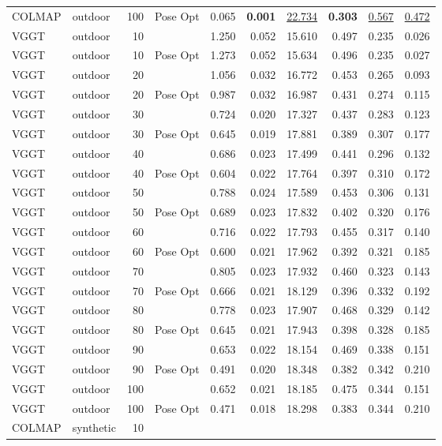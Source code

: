 \begin{table}[H]
\begin{tabular}{llrlrrrrrr}
COLMAP & outdoor & 100 & Pose Opt & 0.065 & \textbf{0.001} & \underline{22.734} & \textbf{0.303} & \underline{0.567} & \underline{0.472} \\
VGGT & outdoor & 10 &  & 1.250 & 0.052 & 15.610 & 0.497 & 0.235 & 0.026 \\
VGGT & outdoor & 10 & Pose Opt & 1.273 & 0.052 & 15.634 & 0.496 & 0.235 & 0.027 \\
VGGT & outdoor & 20 &  & 1.056 & 0.032 & 16.772 & 0.453 & 0.265 & 0.093 \\
VGGT & outdoor & 20 & Pose Opt & 0.987 & 0.032 & 16.987 & 0.431 & 0.274 & 0.115 \\
VGGT & outdoor & 30 &  & 0.724 & 0.020 & 17.327 & 0.437 & 0.283 & 0.123 \\
VGGT & outdoor & 30 & Pose Opt & 0.645 & 0.019 & 17.881 & 0.389 & 0.307 & 0.177 \\
VGGT & outdoor & 40 &  & 0.686 & 0.023 & 17.499 & 0.441 & 0.296 & 0.132 \\
VGGT & outdoor & 40 & Pose Opt & 0.604 & 0.022 & 17.764 & 0.397 & 0.310 & 0.172 \\
VGGT & outdoor & 50 &  & 0.788 & 0.024 & 17.589 & 0.453 & 0.306 & 0.131 \\
VGGT & outdoor & 50 & Pose Opt & 0.689 & 0.023 & 17.832 & 0.402 & 0.320 & 0.176 \\
VGGT & outdoor & 60 &  & 0.716 & 0.022 & 17.793 & 0.455 & 0.317 & 0.140 \\
VGGT & outdoor & 60 & Pose Opt & 0.600 & 0.021 & 17.962 & 0.392 & 0.321 & 0.185 \\
VGGT & outdoor & 70 &  & 0.805 & 0.023 & 17.932 & 0.460 & 0.323 & 0.143 \\
VGGT & outdoor & 70 & Pose Opt & 0.666 & 0.021 & 18.129 & 0.396 & 0.332 & 0.192 \\
VGGT & outdoor & 80 &  & 0.778 & 0.023 & 17.907 & 0.468 & 0.329 & 0.142 \\
VGGT & outdoor & 80 & Pose Opt & 0.645 & 0.021 & 17.943 & 0.398 & 0.328 & 0.185 \\
VGGT & outdoor & 90 &  & 0.653 & 0.022 & 18.154 & 0.469 & 0.338 & 0.151 \\
VGGT & outdoor & 90 & Pose Opt & 0.491 & 0.020 & 18.348 & 0.382 & 0.342 & 0.210 \\
VGGT & outdoor & 100 &  & 0.652 & 0.021 & 18.185 & 0.475 & 0.344 & 0.151 \\
VGGT & outdoor & 100 & Pose Opt & 0.471 & 0.018 & 18.298 & 0.383 & 0.344 & 0.210 \\
\midrule
COLMAP & synthetic & 10 &  &  &  &  &  &  &  \\

\end{tabular}
\end{table}
